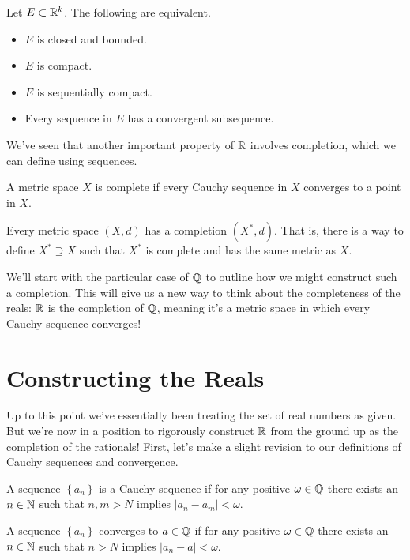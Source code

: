 \documentclass[../m131main.tex]{subfiles}
\begin{document}
\begin{theorem}
    Let $E \subset \mathbb{R}^k$.
    The following are equivalent.
    \begin{itemize}[topsep=0pt]
        \item $E$ is closed and bounded.
        \item $E$ is compact.
        \item $E$ is sequentially compact.
        \item Every sequence in $E$ has a convergent subsequence.
    \end{itemize}
\end{theorem}

We've seen that another important property of $\mathbb{R}$ involves completion, which we can define using sequences.

\begin{definition}[Complete]
    A metric space $X$ is complete if every Cauchy sequence in $X$ converges to a point in $X$.
\end{definition}

\begin{theorem}[Completion] \label{thmCompletion}
    Every metric space $(X, d)$ has a completion $(X^*, d)$.
    That is, there is a way to define $X^* \supseteq X$ such that $X^*$ is complete and has the same metric as $X$.
\end{theorem}

We'll start with the particular case of $\mathbb{Q}$ to outline how we might construct such a completion.
This will give us a new way to think about the completeness of the reals: $\mathbb{R}$ is the completion of $\mathbb{Q}$, meaning it's a metric space in which every Cauchy sequence converges!

\section{Constructing the Reals}
Up to this point we've essentially been treating the set of real numbers as given.
But we're now in a position to rigorously construct $\mathbb{R}$ from the ground up as the completion of the rationals!
First, let's make a slight revision to our definitions of Cauchy sequences and convergence.

\begin{definition}
    A sequence $\left\{ a_n \right\}$ is a Cauchy sequence if for any positive $\omega \in \mathbb{Q}$ there exists an $n \in \mathbb{N}$ such that $n,m > N$ implies $|a_n - a_m| < \omega$.

    A sequence $\left\{ a_n \right\}$ converges to $a \in \mathbb{Q}$ if for any positive $\omega \in \mathbb{Q}$ there exists an $n \in \mathbb{N}$ such that $n > N$ implies $|a_n - a| < \omega$.
\end{definition}
\end{document}
